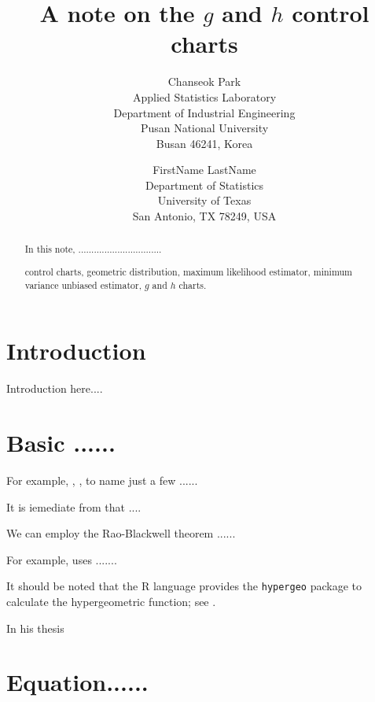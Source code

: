 \documentclass[11pt,a4paper]{article}
\title{\textbf{A note on the $g$ and $h$ control charts}}
\author{\textsf{Chanseok Park}\\
Applied Statistics Laboratory\\
Department of Industrial Engineering\\ Pusan National University\\
Busan 46241, Korea
\and
\textsf{FirstName LastName}\\
Department of Statistics \\
University of Texas \\
San Antonio, TX 78249, USA
}
\date{}
\begin{document}
\maketitle
\begin{abstract}
In this note,  ................................

 control charts, geometric distribution,
maximum likelihood estimator, minimum variance unbiased estimator, $g$ and $h$ charts.

\end{abstract}



\section{Introduction}
Introduction here....



\section{Basic ......} \label{SEC:basic}
For example, \cite{Benneyan:1999}, \cite{Benneyan:2000}, to name just a few ......

It is iemediate from \cite{Lehmann/Casella:1998} that .... 

We can employ the Rao-Blackwell theorem \citep{Rao:1945,Blackwell:1947} ......

For example, \cite{MinitabSupport20} uses .......

It should be noted that the R language provides the \texttt{hypergeo} package to calculate the hypergeometric function; 
see \cite{Hankin:2016}.

In his thesis~\citep{Gao:2020a}

\cite{Jeong/Son/Lee/Kim:2018}

\cite{Ouyang/Park/etc:2019}

\cite{Eun/etc:1989}


\section{Equation......} \label{SEC:Equation}
\end{document}
